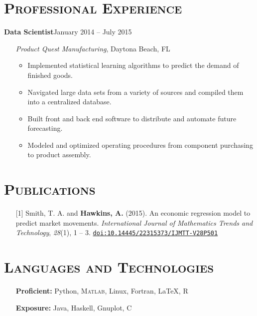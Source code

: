 \documentclass[10pt]{article}
\begin{document}
\section*{\textsc{Professional Experience}}
\textbf{Data Scientist}\hfill January 2014 -- July 2015
\begin{itemize}[noitemsep]
    \item[] \textit{Product Quest Manufacturing}, Daytona Beach, FL
    \begin{itemize}[noitemsep]
        \item Implemented statistical learning algorithms to predict the demand of finished goods.
        \item Navigated large data sets from a variety of sources and compiled them into a centralized database.
        \item Built front and back end software to distribute and automate future forecasting.
        \item Modeled and optimized operating procedures from component purchasing to product assembly.
    \end{itemize}
\end{itemize}

\section*{\textsc{Publications}}
\begin{itemize}[leftmargin=*]
    \item[] [1] Smith, T. A. and \textbf{Hawkins, A.} (2015). An economic regression model to predict market movements. \textit{International Journal of Mathematics Trends and Technology}, \textit{28}(1), 1 -- 3. \texttt{\href{http://dx.doi.org/10.14445/22315373/IJMTT-V28P501}{doi:10.14445/22315373/IJMTT-V28P501}}
\end{itemize}

\section*{\textsc{Languages and Technologies}}
\begin{itemize}
    \item[] \textbf{Proficient:} Python, \textsc{Matlab}, Linux, Fortran, \LaTeX{}, \textsc{R}
    \item[] \textbf{Exposure:} Java, Haskell, Gnuplot, \textsc{C}
\end{itemize}
\end{document}
